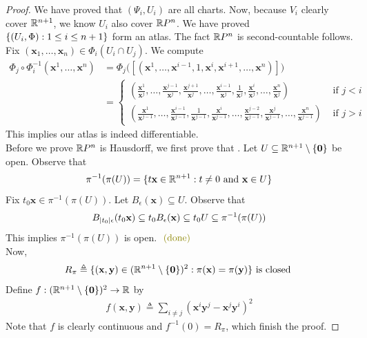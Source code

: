 \documentclass{report}
\begin{document}
\begin{proof}
We have proved that $(\Psi_i,U_i)$ are all charts. Now, because $V_i$ clearly cover $\mathbb{R}^{n+1}$, we know $U_i$ also cover  $\mathbb{R} P^n$. We have proved $\{ (U_i,\Phi):1\leq i\leq n+1 \}$ form an atlas. The fact $\mathbb{R} P^n$ is second-countable follows. \\

Fix $(\textbf{x}_1,\dots ,\textbf{x}_{n})\in \Phi_i(U_i\cap U_j)$. We compute 
\begin{align*}
\Phi_j\circ \Phi_i^{-1} (\textbf{x}^1,\dots ,\textbf{x}^{n} )&=\Phi_j \Big( [(\textbf{x}^1,\dots ,\textbf{x}^{i-1},1,\textbf{x}^i,\textbf{x}^{i+1},\dots, \textbf{x}^n)] \Big) \\
&= \begin{cases}
  (\frac{\textbf{x}^1}{\textbf{x}^j},\dots , \frac{\textbf{x}^{j-1}}{\textbf{x}^j},\frac{\textbf{x}^{j+1}}{\textbf{x}^j},\dots ,\frac{\textbf{x}^{i-1}}{\textbf{x}^j},\frac{1}{\textbf{x}^j},\frac{\textbf{x}^i}{\textbf{x}^j},\dots ,\frac{\textbf{x}^n}{\textbf{x}^j})& \text{ if $j<i$ }\\
  (\frac{\textbf{x}^1}{\textbf{x}^{j-1}},\dots , \frac{\textbf{x}^{i-1}}{\textbf{x}^{j-1}},\frac{1}{\textbf{x}^{j-1}},\frac{\textbf{x}^i}{\textbf{x}^{j-1}},\dots , \frac{\textbf{x}^{j-2}}{\textbf{x}^{j-1}}, \frac{\textbf{x}^j}{\textbf{x}^{j-1}}, \dots,\frac{\textbf{x}^n}{\textbf{x}^{j-1}})& \text{ if $j>i$ }
\end{cases}
\end{align*}
This implies our atlas is indeed differentiable. \\

Before we prove $\mathbb{R} P^n$ is Hausdorff, we first prove that  . Let $U\subseteq \mathbb{R}^{n+1}\setminus \{ \textbf{0} \}$ be open. Observe that 
\begin{align*}
\pi^{-1}(\pi(U))= \{ t\textbf{x}\in\mathbb{R}^{n+1}:t\neq 0\text{ and }\textbf{x}\in U \}
\end{align*}
Fix $t_0\textbf{x}\in \pi^{-1}(\pi (U))$. Let $B_\epsilon (\textbf{x})\subseteq U$. Observe that
\begin{align*}
B_{\left|t_0\right|\epsilon }(t_0\textbf{x})\subseteq t_0B_\epsilon (\textbf{x})\subseteq t_0U\subseteq \pi^{-1}(\pi (U))
\end{align*}
This implies $\pi ^{-1}(\pi (U))$ is open.  $\odone$ \\

Now, 
 \begin{align*}
R_\pi \triangleq \{ (\textbf{x},\textbf{y})\in (\mathbb{R}^{n+1}\setminus \{ \textbf{0} \})^2:\pi (\textbf{x})= \pi (\textbf{y}) \}\text{ is closed }
\end{align*}
Define $f:(\mathbb{R}^{n+1}\setminus \{ \textbf{0} \})^2\rightarrow \mathbb{R}$ by 
\begin{align*}
f(\textbf{x},\textbf{y})\triangleq \sum_{i\neq j} (\textbf{x}^i\textbf{y}^j-\textbf{x}^j \textbf{y}^i)^2
\end{align*}
Note that $f$ is clearly continuous and $f^{-1}(0)=R_\pi$, which finish the proof.
\end{proof}
\end{document}
